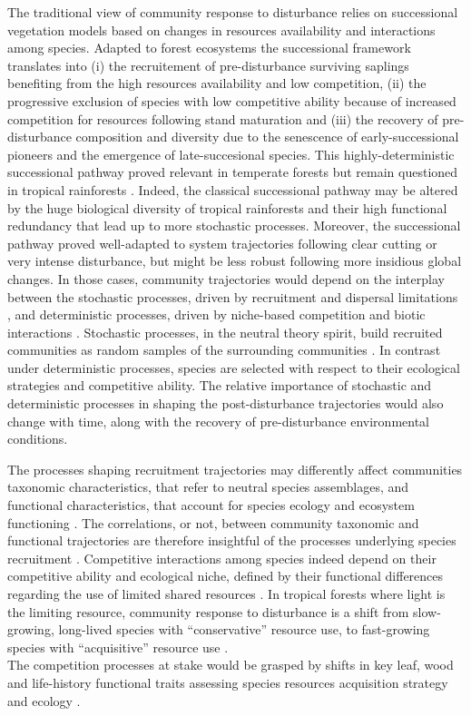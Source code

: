 \documentclass[fleqn,10pt]{ArtEcoFoG} %
\begin{document}
The traditional view of community response to disturbance relies on
successional vegetation models \citep{Clements1916} based on changes in
resources availability and interactions among species. Adapted to forest
ecosystems the successional framework translates into
\citep{Denslow2000} (i) the recruitement of pre-disturbance surviving
saplings benefiting from the high resources availability and low
competition, (ii) the progressive exclusion of species with low
competitive ability because of increased competition for resources
following stand maturation and (iii) the recovery of pre-disturbance
composition and diversity due to the senescence of early-successional
pioneers and the emergence of late-succesional species. This
highly-deterministic successional pathway proved relevant in temperate
forests but remain questioned in tropical rainforests
\citep{Norden2015}. Indeed, the classical successional pathway may be
altered by the huge biological diversity of tropical rainforests and
their high functional redundancy that lead up to more stochastic
processes. Moreover, the successional pathway proved well-adapted to
system trajectories following clear cutting or very intense disturbance,
but might be less robust following more insidious global changes. In
those cases, community trajectories would depend on the interplay
between the stochastic processes, driven by recruitment and dispersal
limitations \citep{Hubbell2001}, and deterministic processes, driven by
niche-based competition and biotic interactions \citep{Adler2007}.
Stochastic processes, in the neutral theory spirit, build recruited
communities as random samples of the surrounding communities
\citep{Hubbell2001, Chave2004}. In contrast under deterministic
processes, species are selected with respect to their ecological
strategies and competitive ability. The relative importance of
stochastic and deterministic processes in shaping the post-disturbance
trajectories would also change with time, along with the recovery of
pre-disturbance environmental conditions.

The processes shaping recruitment trajectories may differently affect
communities taxonomic characteristics, that refer to neutral species
assemblages, and functional characteristics, that account for species
ecology and ecosystem functioning \citep{Violle2007b, Kunstler2016}. The
correlations, or not, between community taxonomic and functional
trajectories are therefore insightful of the processes underlying
species recruitment \citep{Fukami2005}. Competitive interactions among
species indeed depend on their competitive ability and ecological niche,
defined by their functional differences regarding the use of limited
shared resources \citep{Perronne2017}. In tropical forests where light
is the limiting resource, community response to disturbance is a shift
from slow-growing, long-lived species with ``conservative'' resource
use, to fast-growing species with ``acquisitive'' resource use
\citep{Denslow1980, Molino2001, Bongers2009}.\\
The competition processes at stake would be grasped by shifts in key
leaf, wood and life-history functional traits assessing species
resources acquisition strategy and ecology
\citep{Wright2004, Chave2009b, Herault2011}.
\end{document}
